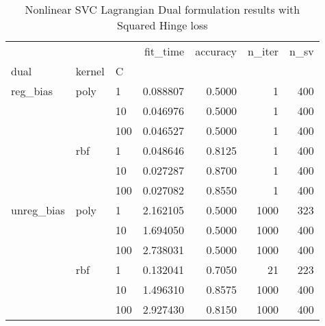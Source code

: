 \begin{table}[H]
\centering
\caption{Nonlinear SVC Lagrangian Dual formulation results with Squared Hinge loss}
\label{nonlinear_lagrangian_dual_l2_svc_cv_results}
\begin{tabular}{lllrrrr}
\toprule
           &     &     &  fit\_time &  accuracy &  n\_iter &  n\_sv \\
dual & kernel & C &           &           &         &       \\
\midrule
reg\_bias & poly & 1   &  0.088807 &    0.5000 &       1 &   400 \\
           &     & 10  &  0.046976 &    0.5000 &       1 &   400 \\
           &     & 100 &  0.046527 &    0.5000 &       1 &   400 \\
           & rbf & 1   &  0.048646 &    0.8125 &       1 &   400 \\
           &     & 10  &  0.027287 &    0.8700 &       1 &   400 \\
           &     & 100 &  0.027082 &    0.8550 &       1 &   400 \\
unreg\_bias & poly & 1   &  2.162105 &    0.5000 &    1000 &   323 \\
           &     & 10  &  1.694050 &    0.5000 &    1000 &   400 \\
           &     & 100 &  2.738031 &    0.5000 &    1000 &   400 \\
           & rbf & 1   &  0.132041 &    0.7050 &      21 &   223 \\
           &     & 10  &  1.496310 &    0.8575 &    1000 &   400 \\
           &     & 100 &  2.927430 &    0.8150 &    1000 &   400 \\
\bottomrule
\end{tabular}
\end{table}
